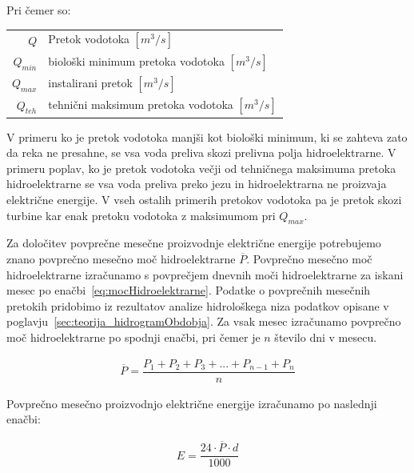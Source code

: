 Pri čemer so:
\begin{table}[htb!]
	\begin{tabular}{r|p{10cm}}
		$Q$ & Pretok vodotoka $\left[m^3/s \right]$\\
		$Q_{min}$ & biološki minimum pretoka vodotoka $\left[m^3/s \right]$ \\
		$Q_{max}$ & instalirani pretok $\left[m^3/s \right]$ \\
		$Q_{teh}$ & tehnični maksimum pretoka vodotoka $\left[m^3/s \right]$ \\
	\end{tabular}
\end{table}

V primeru ko je pretok vodotoka manjši kot biološki minimum, ki se zahteva zato da reka ne presahne, se vsa voda preliva skozi prelivna polja hidroelektrarne. V primeru poplav, ko je pretok vodotoka večji od tehničnega maksimuma pretoka hidroelektrarne se vsa voda preliva preko jezu in hidroelektrarna ne proizvaja električne energije. V vseh ostalih primerih pretokov vodotoka pa je pretok skozi turbine kar enak pretoku vodotoka z maksimumom pri $Q_{max}$.



Za določitev povprečne mesečne proizvodnje električne energije potrebujemo znano povprečno mesečno moč hidroelektrarne  $\overline{P}$. Povprečno mesečno moč hidroelektrarne izračunamo s povprečjem dnevnih moči hidroelektrarne za iskani mesec po enačbi~\ref{eq:mocHidroelektrarne}. Podatke o povprečnih mesečnih pretokih pridobimo iz rezultatov analize hidrološkega niza podatkov opisane v poglavju~\ref{sec:teorija_hidrogramObdobja}. Za vsak mesec izračunamo povprečno moč hidroelektrarne po spodnji enačbi, pri čemer je $n$ število dni v mesecu. 



\begin{ceqn}
\begin{align}
\overline{P} = \dfrac{P_1 + P_2 + P_3 + ... + P_{n-1} + P_n}{n}
\end{align}
\end{ceqn}



Povprečno mesečno proizvodnjo električne energije izračunamo po naslednji enačbi:

\begin{ceqn}
\begin{align}
E = \dfrac{24 \cdot \overline{P} \cdot d}{1000}
\end{align}
\end{ceqn}

